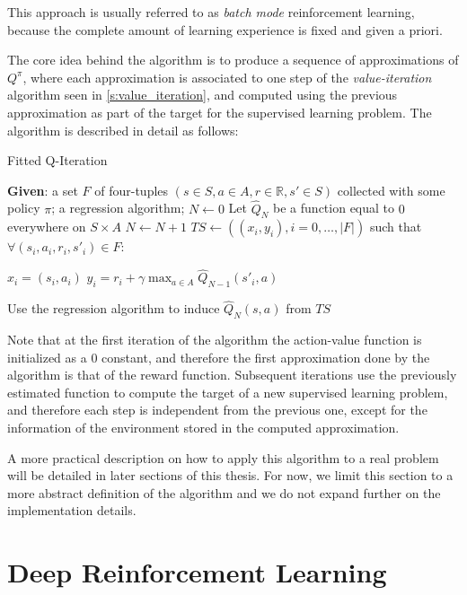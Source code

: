 This approach is usually referred to as \textit{batch mode} reinforcement 
learning, because the complete amount of learning experience is fixed and given
a priori.

The core idea behind the algorithm is to produce a sequence of approximations of
$Q^\pi$, where each approximation is associated to one step of the 
\textit{value-iteration} algorithm seen in \ref{s:value_iteration}, and computed
using the previous approximation as part of the target for the supervised 
learning problem. The algorithm is described in detail as follows:
%
\begin{algorithm}[H]
    \caption{Fitted Q-Iteration}
    \begin{algorithmic}
        \STATE \textbf{Given}: a set $F$ of four-tuples $(s \in S, a \in A, r \in \mathbb{R}, s' \in S)$ collected with some policy $\pi$; a regression algorithm;
        \STATE $N \leftarrow 0$
        \STATE Let $\hat{Q}_N$ be a function equal to $0$ everywhere on $S \times A$
        \REPEAT
	    \STATE $N \leftarrow N+1$
	    \STATE $TS \leftarrow ((x_i, y_i), i = 0, \dots, |F|)$ such that $\forall (s_i, a_i, r_i, s'_i) \in F$:
		\begin{ALC@g}
		\STATE $x_i = (s_i, a_i)$
		\STATE $y_i = r_i + \gamma \max_{a \in A} \hat{Q}_{N-1} (s'_i, a)$
		\end{ALC@g}
	    \STATE Use the regression algorithm to induce $\hat{Q}_N(s, a)$ from $TS$
    \end{algorithmic}
\end{algorithm}
%

Note that at the first iteration of the algorithm the action-value function is
initialized as a $0$ constant, and therefore the first approximation done by the 
algorithm is that of the reward function.
Subsequent iterations use the previously estimated function to compute the 
target of a new supervised learning problem, and therefore each step is 
independent from the previous one, except for the information of the environment 
stored in the computed approximation. 

A more practical description on how to apply this algorithm to a real problem
will be detailed in later sections of this thesis. For now, we limit this 
section to a more abstract definition of the algorithm and we do not expand 
further on the implementation details. 

\section{Deep Reinforcement Learning} \label{s:DRL}


